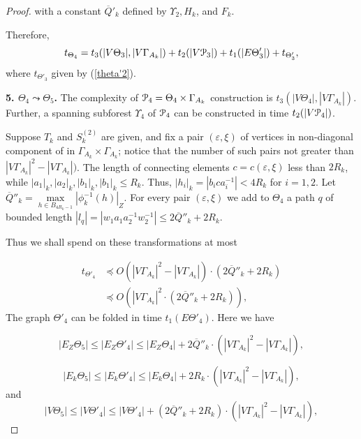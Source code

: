 \documentclass[a4paper,12pt]{article}
\newcommand{\G}{\Gamma }
\newcommand{\e}{\varepsilon }
\newcommand{\T}{\Theta }
\newcommand{\U}{\Upsilon }
\newcommand{\cP}{{\cal{P}}}
\numberwithin{equation}{section}
\numberwithin{figure}{section}
\begin{document}
\begin{proof}
with a constant $\overline{Q}'_k$ defined by $\U_2, H_k$, and
$F_k$.


Therefore,
\begin{equation}\label{theta2}
t_{\T_4} = t_3(|V \T_3|, |V \G_{A_k}|) + t_2(|V\cP_3|)+
t_1(|E\T'_3|) + t_{\T'_3},
\end{equation}
where $t_{\T'_3}$ given by (\ref{theta'2}).

{\bf 5. $\T_4 \leadsto \T_5$.} The complexity of $\cP_4=\T_4\times
\G_{A_k}$ construction is $t_3(|V \T_4|, |V \G_{A_k}|)$. Further,
 a spanning subforest $\U_4$ of $\cP_4$ can be constructed in time
$t_2(|V\cP_4|)$.

Suppose $T_k$ and $S^{(2)}_k$ are given, and fix a pair $(\e,\xi)
$ of vertices in non-diagonal component of in $\G_{A_k}\times
\G_{A_k}$; notice that the number of such pairs not greater than
$|V \G_{A_k}|^2-|V \G_{A_k}|)$. The length of connecting elements
$c=c(\e,\xi)$ less than $2R_k$, while $|a_1|_k,|a_2|_k, |b_1|_k,
|b_1|_k \le R_k$. Thus, $|h_i|_k = |b_ica_i^{-1}| < 4R_k$ for
$i=1,2$. Let $\overline{Q}''_k=\mathop{max}\limits_{h \in
B_{4R_k-1}}|\phi^{-1}_k(h)|_Z$. For every pair $(\e,\xi) $ we add
to $\T_4$ a path $q$ of bounded length $|l_q|= |w_1 a_1a_2^{-1}
w_2^{-1}| \le 2 \overline{Q}''_k +2 R_k$.

Thus we shall spend on these transformations at most

\begin{equation}\label{theta'4}
\begin{split}
t_{\T'_4} &\preceq O(|V \G_{A_k}|^2-|V \G_{A_k}|)\cdot(2\overline{Q}''_k+2R_k)\\
&\preceq O(|V \G_{A_k}|^2 \cdot (2\overline{Q}''_k+2R_k)),
\end{split}
\end{equation}
The graph $\T'_4$ can be folded in time $t_1(E\T'_4)$. Here we
have

\begin{equation}\label{eztheta4}
|E_Z\T_5| \le |E_Z\T'_4| \le |E_Z\T_4|+ 2\overline{Q}''_k\cdot(|V
\G_{A_k}|^2-|V \G_{A_k}|),
\end{equation}

\begin{equation}\label{eztheta4}
|E_k\T_5| \le |E_k\T'_4| \le  |E_k\T_4|+ 2R_k\cdot(|V
\G_{A_k}|^2-|V \G_{A_k}|),
\end{equation}
and
\begin{equation}\label{vtheta4}
|V\T_5| \le |V \T'_4| \le |V
\T'_4|+(2\overline{Q}''_k+2R_k)\cdot(|V \G_{A_k}|^2-|V \G_{A_k}|),
\end{equation}


\end{proof}
\end{document}

